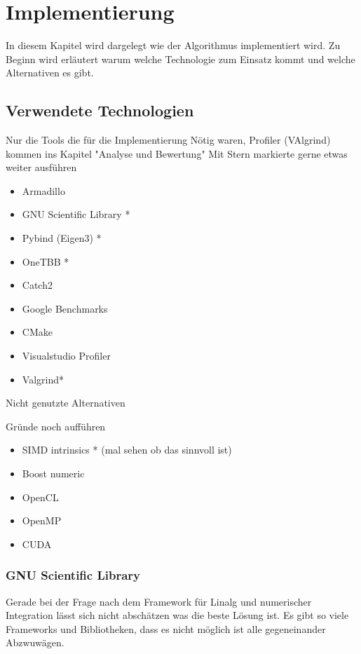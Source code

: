\chapter{Implementierung}

In diesem Kapitel wird dargelegt wie der Algorithmus implementiert wird. Zu Beginn wird erläutert warum welche Technologie zum Einsatz kommt und welche Alternativen es gibt.
\section{Verwendete Technologien}

Nur die Tools die für die Implementierung Nötig waren,
Profiler (VAlgrind) kommen ins Kapitel "Analyse und Bewertung"
Mit Stern markierte gerne etwas weiter ausführen
\begin{itemize}
    \item Armadillo
    \item GNU Scientific Library *
    \item Pybind (Eigen3) *
    \item OneTBB *
    \item Catch2
    \item Google Benchmarks
    \item CMake
    \item Visualstudio Profiler
    \item Valgrind*
\end{itemize}



Nicht genutzte Alternativen

Gründe noch aufführen
\begin{itemize}
    \item SIMD intrinsics * (mal sehen ob das sinnvoll ist)
    \item Boost numeric
    \item OpenCL
    \item OpenMP
    \item CUDA
\end{itemize}

\subsection{GNU Scientific Library}

Gerade bei der Frage nach dem Framework für Linalg und numerischer Integration lässt sich nicht abschätzen was die beste Lösung ist. Es gibt
so viele Frameworks und Bibliotheken, dass es nicht möglich ist alle gegeneinander Abzwuwägen.

